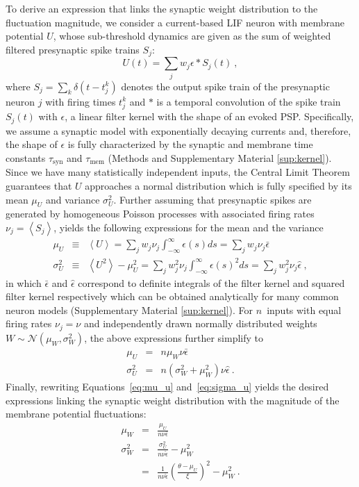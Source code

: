 \documentclass[11pt,a4paper]{article}
\begin{document}
To derive an expression that links the synaptic weight distribution to the
fluctuation magnitude, we consider a current-based \ac{LIF} neuron with
membrane potential $U$, whose
sub-threshold dynamics are given as the 
sum of weighted filtered presynaptic spike trains $S_j$:
\begin{equation}
	U(t) = \sum_j w_{j} \epsilon \ast S_j(t)~,
\end{equation}
where  $S_j = \sum_k \delta(t-t_j^k)$ denotes the output spike train of the presynaptic
neuron $j$ with firing times $t_j^k$ and $\ast$ is a temporal convolution of the spike train $S_j(t)$ with
$\epsilon$, a linear filter kernel with the shape of an evoked \ac{PSP}. 
Specifically, we assume a synaptic model with exponentially decaying currents
and, therefore, the shape of $\epsilon$ is fully characterized by the synaptic
and membrane time constants $\tau_{\text{syn}}$ and $\tau_{\text{mem}}$
(Methods and Supplementary Material \ref{sup:kernel}).
Since we have many statistically independent inputs, the Central Limit Theorem guarantees
that $U$ approaches a normal distribution which is fully specified by its mean
$\mu_U$ and variance $\sigma_U^2$.
Further assuming that presynaptic spikes are generated by homogeneous
Poisson processes with associated firing rates $\nu_j = \left\langle S_j
\right\rangle$,  
yields the following expressions for the mean and the variance
\begin{eqnarray} 
\mu_U &\equiv& \left\langle U \right\rangle = \sum_j w_{j} \nu_j
\int_{-\infty}^\infty \epsilon(s) ds = \sum_j
w_{j} \nu_j \bar\epsilon
\label{eq:main-mu-u} \\
\sigma^2_{U} &\equiv& \left\langle U^2 \right\rangle -\mu_U^2 =\sum_j w_{j}^2
\nu_j \int_{-\infty}^\infty \epsilon(s)^2 ds
	= \sum_j w_{j}^2 \nu_j \hat{\epsilon} ~,
	\label{eq:main-sigma-u}
\end{eqnarray}
in which $\bar \epsilon$ and $\hat \epsilon$ correspond to definite integrals
of the filter kernel and squared filter kernel respectively which can be obtained analytically for many common neuron
models (Supplementary Material \ref{sup:kernel}).
For $n$~inputs with equal firing rates $\nu_j=\nu$
and independently
drawn normally distributed weights $W \sim \mathcal{N} \left(\mu_W,
\sigma_W^2\right)$, the above expressions further simplify to
\begin{eqnarray} 
\mu_U &=& n \mu_W\nu\bar\epsilon
\label{eq:mu_u} 
\\
\sigma^2_{U}&=& n(\sigma_W^2 + \mu_W^2)\nu\hat\epsilon ~.
\label{eq:sigma_u}
\end{eqnarray}
Finally, rewriting Equations~\eqref{eq:mu_u} and~\eqref{eq:sigma_u} yields the
desired expressions linking the synaptic weight distribution with the magnitude
of the membrane potential fluctuations:
\begin{eqnarray}
\mu_W &=& \frac{\mu_U}{n \nu \bar\epsilon}
\label{eq:wbar} 
\\
\sigma^2_W &=& \frac{\sigma_U^2}{n \nu \hat\epsilon} - \mu_W^2
\nonumber
\\
&=& \frac{1}{n \nu \hat\epsilon} \left(\frac{\theta - \mu_U}{\xi} \right)^2 - \mu_W^2 ~.
\label{eq:wsigma}
\end{eqnarray}
\end{document}
